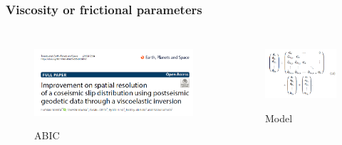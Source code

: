 ﻿\documentclass{beamer}
\begin{document}
\begin{frame}
\frametitle{Viscosity or frictional parameters}

\begin{columns}[c] %

\begin{figure}
  \centering
  \includegraphics[scale=0.3]{./pic/abic.png}\\
  \caption{ABIC}\label{fig_okada}
\end{figure}

\begin{figure}
  \centering
  \includegraphics[scale=0.4]{./pic/abic2.png}\\
  \caption{Model}\label{fig_okada}
\end{figure}

\end{columns}

\end{frame}
\end{document}
